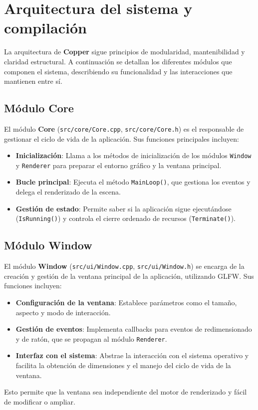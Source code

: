 \chapter{Arquitectura del sistema y compilación}

La arquitectura de \textbf{Copper} sigue principios de modularidad,
mantenibilidad y claridad estructural. A continuación se detallan los
diferentes módulos que componen el sistema, describiendo su funcionalidad y las
interacciones que mantienen entre sí.

\section{Módulo Core}

El módulo \textbf{Core} (\texttt{src/core/Core.cpp}, \texttt{src/core/Core.h})
es el responsable de gestionar el ciclo de vida de la aplicación. Sus funciones
principales incluyen:
\begin{itemize}
    \item \textbf{Inicialización}: Llama a los métodos de inicialización de los módulos \texttt{Window} y \texttt{Renderer} para preparar el entorno gráfico y la ventana principal.
    \item \textbf{Bucle principal}: Ejecuta el método \texttt{MainLoop()}, que gestiona los eventos y delega el renderizado de la escena.
    \item \textbf{Gestión de estado}: Permite saber si la aplicación sigue ejecutándose (\texttt{IsRunning()}) y controla el cierre ordenado de recursos (\texttt{Terminate()}).
\end{itemize}

\section{Módulo Window}

El módulo \textbf{Window} (\texttt{src/ui/Window.cpp},
\texttt{src/ui/Window.h}) se encarga de la creación y gestión de la ventana
principal de la aplicación, utilizando GLFW. Sus funciones incluyen:
\begin{itemize}
    \item \textbf{Configuración de la ventana}: Establece parámetros como el tamaño, aspecto y modo de interacción.
    \item \textbf{Gestión de eventos}: Implementa callbacks para eventos de redimensionado y de ratón, que se propagan al módulo \texttt{Renderer}.
    \item \textbf{Interfaz con el sistema}: Abstrae la interacción con el sistema operativo y facilita la obtención de dimensiones y el manejo del ciclo de vida de la ventana.
\end{itemize}
Esto permite que la ventana sea independiente del motor de renderizado y fácil de modificar o ampliar.


